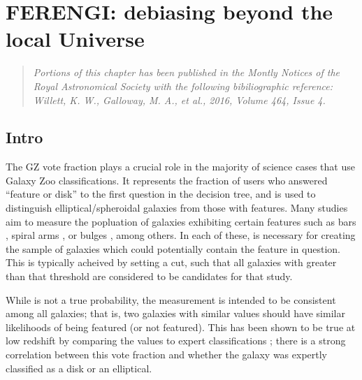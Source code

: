 



\chapter{FERENGI: debiasing beyond the local Universe}
\label{chap:ferengi}
\begin{quote}
\emph{ Portions of this chapter has been published in the Montly Notices of the Royal Astronomical Society with the following bibiliographic reference:  Willett, K. W., Galloway, M. A., et al., 2016, Volume 464, Issue 4.}\\
\end{quote}
\section{Intro}
\label{sec:ferengi_Intro}

The GZ vote fraction \ffeatures{} plays a crucial role in the majority of science cases that use Galaxy Zoo classifications. It represents the fraction of users who answered ``feature or disk'' to the first question in the decision tree, and is used to distinguish elliptical/spheroidal galaxies from those with features. Many studies aim to measure the popluation of galaxies exhibiting certain features such as bars \citep{Masters2010,Masters2012,Melvin2014,Simmons2014,Cheung2015,Kruk2017}, spiral arms \citep{Willett2015,Hart2017}, or bulges \citep{Skibba2012,Simmons2012}, among others. In each of these, \ffeatures{} is necessary for creating the sample of galaxies which could potentially contain the feature in question. This is typically acheived by setting a cut, such that all galaxies with \ffeatures{} greater than that threshold are considered to be candidates for that study.

While \ffeatures{} is not a true probability, the measurement is intended to be consistent among all galaxies; that is, two galaxies with similar \ffeatures{} values should have similar likelihoods of being featured (or not featured). This has been shown to be true at low redshift by comparing the \ffeatures values to expert classifications \citep{Willett2013}; there is a strong correlation between this vote fraction and whether the galaxy was expertly classified as a disk or an elliptical.    

